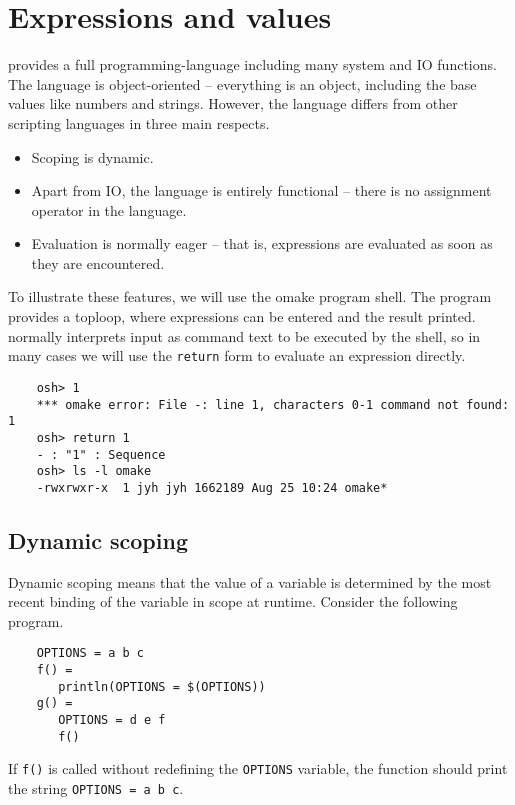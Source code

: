 %
%
\chapter{Expressions and values}
\label{chaper:extra}

 provides a full programming-language including many
system and IO functions.  The language is object-oriented -- everything is
an object, including the base values like numbers and strings.  However,
the  language differs from other scripting languages in
three main respects.

\begin{itemize}
\item Scoping is dynamic.
\item Apart from IO, the language is entirely functional -- there is no
  assignment operator in the language.
\item Evaluation is normally eager -- that is, expressions are evaluated as soon
  as they are encountered.
\end{itemize}

To illustrate these features, we will use the  omake program shell.
The  program provides a toploop, where expressions can be entered
and the result printed.   normally interprets input as command text
to be executed by the shell, so in many cases we will use the \verb+return+
form to evaluate an expression directly.

\begin{verbatim}
    osh> 1
    *** omake error: File -: line 1, characters 0-1 command not found: 1
    osh> return 1
    - : "1" : Sequence
    osh> ls -l omake
    -rwxrwxr-x  1 jyh jyh 1662189 Aug 25 10:24 omake*
\end{verbatim}

\section{Dynamic scoping}

Dynamic scoping means that the value of a variable is determined by the most
recent binding of the variable in scope at runtime.  Consider the following
program.

\begin{verbatim}
    OPTIONS = a b c
    f() =
       println(OPTIONS = $(OPTIONS))
    g() =
       OPTIONS = d e f
       f()
\end{verbatim}

If \verb+f()+ is called without redefining the \verb+OPTIONS+ variable,
the function should print the string \verb+OPTIONS = a b c+.

